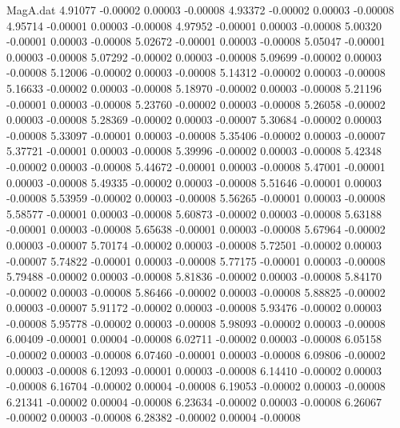 \begin{filecontents}{MagA.dat}
   4.91077   -0.00002    0.00003   -0.00008
   4.93372   -0.00002    0.00003   -0.00008
   4.95714   -0.00001    0.00003   -0.00008
   4.97952   -0.00001    0.00003   -0.00008
   5.00320   -0.00001    0.00003   -0.00008
   5.02672   -0.00001    0.00003   -0.00008
   5.05047   -0.00001    0.00003   -0.00008
   5.07292   -0.00002    0.00003   -0.00008
   5.09699   -0.00002    0.00003   -0.00008
   5.12006   -0.00002    0.00003   -0.00008
   5.14312   -0.00002    0.00003   -0.00008
   5.16633   -0.00002    0.00003   -0.00008
   5.18970   -0.00002    0.00003   -0.00008
   5.21196   -0.00001    0.00003   -0.00008
   5.23760   -0.00002    0.00003   -0.00008
   5.26058   -0.00002    0.00003   -0.00008
   5.28369   -0.00002    0.00003   -0.00007
   5.30684   -0.00002    0.00003   -0.00008
   5.33097   -0.00001    0.00003   -0.00008
   5.35406   -0.00002    0.00003   -0.00007
   5.37721   -0.00001    0.00003   -0.00008
   5.39996   -0.00002    0.00003   -0.00008
   5.42348   -0.00002    0.00003   -0.00008
   5.44672   -0.00001    0.00003   -0.00008
   5.47001   -0.00001    0.00003   -0.00008
   5.49335   -0.00002    0.00003   -0.00008
   5.51646   -0.00001    0.00003   -0.00008
   5.53959   -0.00002    0.00003   -0.00008
   5.56265   -0.00001    0.00003   -0.00008
   5.58577   -0.00001    0.00003   -0.00008
   5.60873   -0.00002    0.00003   -0.00008
   5.63188   -0.00001    0.00003   -0.00008
   5.65638   -0.00001    0.00003   -0.00008
   5.67964   -0.00002    0.00003   -0.00007
   5.70174   -0.00002    0.00003   -0.00008
   5.72501   -0.00002    0.00003   -0.00007
   5.74822   -0.00001    0.00003   -0.00008
   5.77175   -0.00001    0.00003   -0.00008
   5.79488   -0.00002    0.00003   -0.00008
   5.81836   -0.00002    0.00003   -0.00008
   5.84170   -0.00002    0.00003   -0.00008
   5.86466   -0.00002    0.00003   -0.00008
   5.88825   -0.00002    0.00003   -0.00007
   5.91172   -0.00002    0.00003   -0.00008
   5.93476   -0.00002    0.00003   -0.00008
   5.95778   -0.00002    0.00003   -0.00008
   5.98093   -0.00002    0.00003   -0.00008
   6.00409   -0.00001    0.00004   -0.00008
   6.02711   -0.00002    0.00003   -0.00008
   6.05158   -0.00002    0.00003   -0.00008
   6.07460   -0.00001    0.00003   -0.00008
   6.09806   -0.00002    0.00003   -0.00008
   6.12093   -0.00001    0.00003   -0.00008
   6.14410   -0.00002    0.00003   -0.00008
   6.16704   -0.00002    0.00004   -0.00008
   6.19053   -0.00002    0.00003   -0.00008
   6.21341   -0.00002    0.00004   -0.00008
   6.23634   -0.00002    0.00003   -0.00008
   6.26067   -0.00002    0.00003   -0.00008
   6.28382   -0.00002    0.00004   -0.00008

\end{filecontents}
